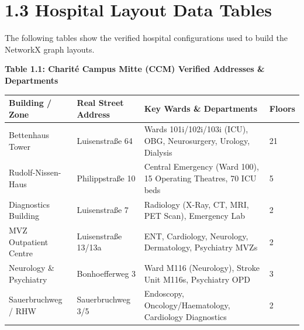 \documentclass[12pt,a4paper]{report}
\begin{document}
\section{1.3 Hospital Layout Data Tables}

The following tables show the verified hospital configurations used to build the NetworkX graph layouts.


\begin{center}\textbf{Table 1.1: Charit\'{e} Campus Mitte (CCM) Verified Addresses \& Departments}\end{center}
\begin{table}[htbp]
\centering
\small
\begin{tabularx}{\textwidth}{|l|l|X|l|}
\hline
Building / Zone & Real Street Address & Key Wards \& Departments & Floors \\
\hline
\hline
Bettenhaus Tower & Luisenstraße 64 & Wards 101i/102i/103i (ICU), OBG, Neurosurgery, Urology, Dialysis & 21 \\
\hline
Rudolf-Nissen-Haus & Philippstraße 10 & Central Emergency (Ward 100), 15 Operating Theatres, 70 ICU beds & 5 \\
\hline
Diagnostics Building & Luisenstraße 7 & Radiology (X-Ray, CT, MRI, PET Scan), Emergency Lab & 2 \\
\hline
MVZ Outpatient Centre & Luisenstraße 13/13a & ENT, Cardiology, Neurology, Dermatology, Psychiatry MVZs & 2 \\
\hline
Neurology \& Psychiatry & Bonhoefferweg 3 & Ward M116 (Neurology), Stroke Unit M116s, Psychiatry OPD & 3 \\
\hline
Sauerbruchweg / RHW & Sauerbruchweg 3/5 & Endoscopy, Oncology/Haematology, Cardiology Diagnostics & 2 \\
\hline
\end{tabularx}
\end{table}
\end{document}
